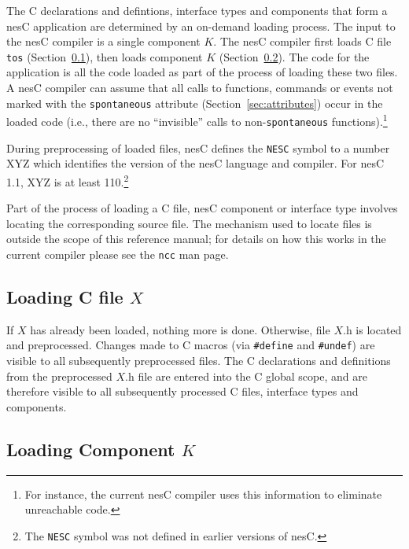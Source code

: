 \documentclass[11pt,letterpaper]{article}
\newcommand{\kw}[1]{{\tt #1}}
\newcommand{\code}[1]{{\tt #1}}
\newcommand{\file}[1]{{\tt #1}}
\newcommand{\nesc}{nesC\xspace}
\begin{document}
The C declarations and defintions, interface types and components that form
a \nesc application are determined by an on-demand loading process. The
input to the \nesc compiler is a single component $K$. The \nesc compiler
first loads C file \file{tos} (Section~\ref{sec:load-c}), then loads
component $K$ (Section~\ref{sec:load-component}). The code for the
application is all the code loaded as part of the process of loading these
two files. A \nesc compiler can assume that all calls to functions,
commands or events not marked with the \code{spontaneous} attribute
(Section~\ref{sec:attributes}) occur in the loaded code (i.e., there are no
``invisible'' calls to non-\code{spontaneous} functions).\footnote{For
instance, the current \nesc compiler uses this information to eliminate
unreachable code.}

During preprocessing of loaded files, \nesc defines the \kw{NESC} symbol to
a number XYZ which identifies the version of the \nesc language and compiler.
For \nesc 1.1, XYZ is at least 110.\footnote{The \kw{NESC} symbol was not
defined in earlier versions of \nesc.}

Part of the process of loading a C file, \nesc component or interface type
involves locating the corresponding source file. The mechanism used to
locate files is outside the scope of this reference manual; for details on
how this works in the current compiler please see the \file{ncc} man page.

\subsection{Loading C file $X$}
\label{sec:load-c}

If $X$ has already been loaded, nothing more is done. Otherwise, file $X$.h
is located and preprocessed. Changes made to C macros (via \code{\#define}
and \code{\#undef}) are visible to all subsequently preprocessed files. The C
declarations and definitions from the preprocessed $X$.h file are entered
into the C global scope, and are therefore visible to all subsequently
processed C files, interface types and components.

\subsection{Loading Component $K$}
\label{sec:load-component}
\end{document}
